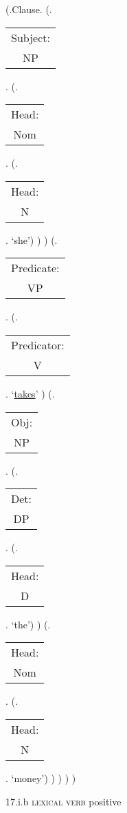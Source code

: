 \documentclass[12pt,letterpaper]{article}
\begin{document}
\begin{figure}
	\begin{center}
		\begin{parsetree}
			(.Clause.
			(.\begin{tabular}{c}Subject:\\NP\end{tabular}.  
			(.\begin{tabular}{c}Head:\\Nom\end{tabular}.
			(.\begin{tabular}{c}Head:\\N\end{tabular}. `she')
			)
			)
			(.\begin{tabular}{c}Predicate:\\VP\end{tabular}.
			(.\begin{tabular}{c}Predicator:\\V\end{tabular}.    `\underline{takes}' )
			(.\begin{tabular}{c}Obj:\\NP\end{tabular}.  
			(.\begin{tabular}{c}Det:\\DP\end{tabular}.  
			(.\begin{tabular}{c}Head:\\D\end{tabular}. `the')
			)
			(.\begin{tabular}{c}Head:\\Nom\end{tabular}.
			(.\begin{tabular}{c}Head:\\N\end{tabular}. `money')
			)
			)
			)
			) 
			
		\end{parsetree}
		\hfill \break \hfill \break
		17.i.b \textsc{lexical verb} positive
	\end{center}
\end{figure}
\end{document}
